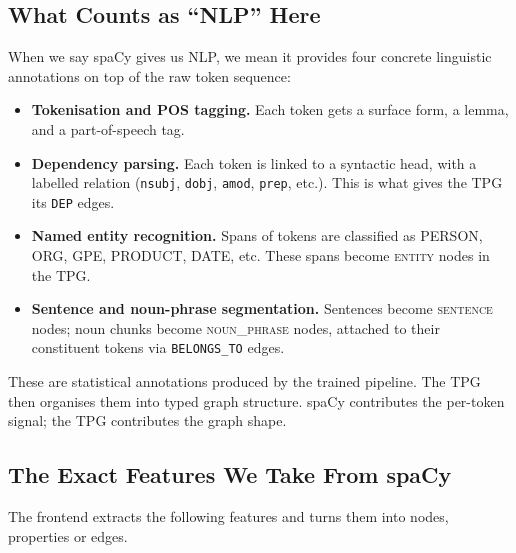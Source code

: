 \documentclass[11pt]{article}
\begin{document}
\subsection{What Counts as ``NLP'' Here}

When we say spaCy gives us NLP, we mean it provides four concrete
linguistic annotations on top of the raw token sequence:

\begin{itemize}
    \item \textbf{Tokenisation and POS tagging.} Each token gets a
    surface form, a lemma, and a part-of-speech tag.
    \item \textbf{Dependency parsing.} Each token is linked to a
    syntactic head, with a labelled relation
    (\texttt{nsubj}, \texttt{dobj}, \texttt{amod}, \texttt{prep}, etc.).
    This is what gives the TPG its \texttt{DEP} edges.
    \item \textbf{Named entity recognition.} Spans of tokens are
    classified as PERSON, ORG, GPE, PRODUCT, DATE, etc. These spans
    become \textsc{entity} nodes in the TPG.
    \item \textbf{Sentence and noun-phrase segmentation.} Sentences
    become \textsc{sentence} nodes; noun chunks become
    \textsc{noun\_phrase} nodes, attached to their constituent tokens
    via \texttt{BELONGS\_TO} edges.
\end{itemize}

These are statistical annotations produced by the trained pipeline.
The TPG then organises them into typed graph structure. spaCy
contributes the per-token signal; the TPG contributes the graph shape.

\subsection{The Exact Features We Take From spaCy}

The frontend extracts the following features and turns them into
nodes, properties or edges.
\end{document}
